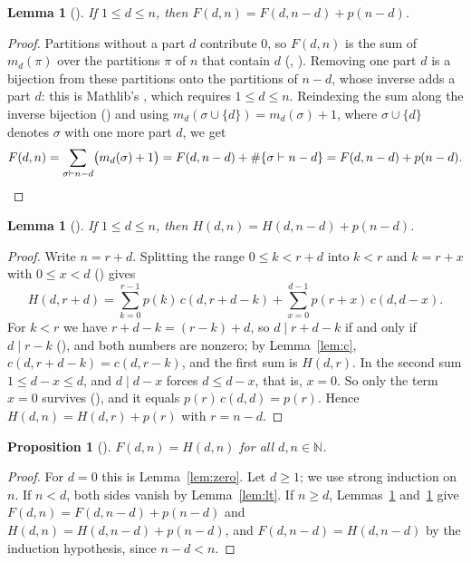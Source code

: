 \documentclass[11pt]{amsart}
\theoremstyle{plain}
\newtheorem{lemma}[theorem]{Lemma}
\newtheorem{proposition}[theorem]{Proposition}
\theoremstyle{definition}
\newcommand{\N}{\mathbb{N}}
\begin{document}
\begin{lemma}[]\label{lem:Fge}
If $1\le d\le n$, then $F(d,n)=F(d,n-d)+p(n-d)$.
\end{lemma}

\begin{proof}
Partitions without a part $d$ contribute $0$, so $F(d,n)$ is the sum of $m_d(\pi)$ over the partitions $\pi$ of $n$ that contain $d$ (, ).
Removing one part $d$ is a bijection from these partitions onto the partitions of $n-d$, whose inverse adds a part $d$: this is Mathlib's , which requires $1\le d\le n$.
Reindexing the sum along the inverse bijection () and using $m_d(\sigma\cup\{d\})=m_d(\sigma)+1$, where $\sigma\cup\{d\}$ denotes $\sigma$ with one more part $d$, we get
\[
  F(d,n)=\sum_{\sigma\vdash n-d}\bigl(m_d(\sigma)+1\bigr)=F(d,n-d)+\#\{\sigma\vdash n-d\}=F(d,n-d)+p(n-d).\qedhere
\]
\end{proof}

\begin{lemma}[]\label{lem:Hge}
If $1\le d\le n$, then $H(d,n)=H(d,n-d)+p(n-d)$.
\end{lemma}

\begin{proof}
Write $n=r+d$. Splitting the range $0\le k<r+d$ into $k<r$ and $k=r+x$ with $0\le x<d$ () gives
\[
  H(d,r+d)=\sum_{k=0}^{r-1}p(k)\,c(d,r+d-k)+\sum_{x=0}^{d-1}p(r+x)\,c(d,d-x).
\]
For $k<r$ we have $r+d-k=(r-k)+d$, so $d\mid r+d-k$ if and only if $d\mid r-k$ (), and both numbers are nonzero; by Lemma~\ref{lem:c}, $c(d,r+d-k)=c(d,r-k)$, and the first sum is $H(d,r)$.
In the second sum $1\le d-x\le d$, and $d\mid d-x$ forces $d\le d-x$, that is, $x=0$. So only the term $x=0$ survives (), and it equals $p(r)\,c(d,d)=p(r)$.
Hence $H(d,n)=H(d,r)+p(r)$ with $r=n-d$.
\end{proof}

\begin{proposition}[]\label{prop:FH}
$F(d,n)=H(d,n)$ for all $d,n\in\N$.
\end{proposition}

\begin{proof}
For $d=0$ this is Lemma~\ref{lem:zero}. Let $d\ge1$; we use strong induction on $n$.
If $n<d$, both sides vanish by Lemma~\ref{lem:lt}.
If $n\ge d$, Lemmas~\ref{lem:Fge} and~\ref{lem:Hge} give $F(d,n)=F(d,n-d)+p(n-d)$ and $H(d,n)=H(d,n-d)+p(n-d)$, and $F(d,n-d)=H(d,n-d)$ by the induction hypothesis, since $n-d<n$.
\end{proof}
\end{document}
